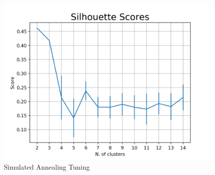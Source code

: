\documentclass[a4paper,12pt]{article}
\begin{document}
\begin{figure}[!htb]
\begin{minipage}{0.33\textwidth}
     \includegraphics[width=.95\linewidth]{em_ica_dataset1_sil}
   \end{minipage}\hfill
 \caption { Simulated Annealing Tuning}
\end{figure}
\end{document}
